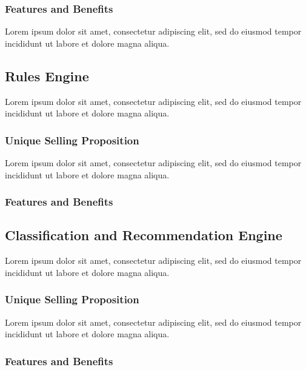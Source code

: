 \subsubsection*{Features and Benefits}
Lorem ipsum dolor sit amet, consectetur adipiscing elit, sed do eiusmod tempor incididunt ut labore et dolore magna aliqua.


\subsection{Rules Engine}
Lorem ipsum dolor sit amet, consectetur adipiscing elit, sed do eiusmod tempor incididunt ut labore et dolore magna aliqua.

\subsubsection*{Unique Selling Proposition}

Lorem ipsum dolor sit amet, consectetur adipiscing elit, sed do eiusmod tempor incididunt ut labore et dolore magna aliqua.

\subsubsection*{Features and Benefits}


\subsection{Classification and Recommendation Engine}

Lorem ipsum dolor sit amet, consectetur adipiscing elit, sed do eiusmod tempor incididunt ut labore et dolore magna aliqua.

\subsubsection*{Unique Selling Proposition}

Lorem ipsum dolor sit amet, consectetur adipiscing elit, sed do eiusmod tempor incididunt ut labore et dolore magna aliqua.

\subsubsection*{Features and Benefits}

